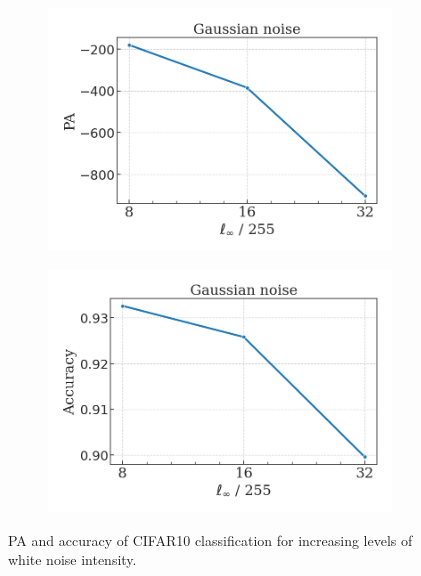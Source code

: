 \begin{figure}[H]
    \centering
    \begin{subfigure}[b]{0.45\textwidth}
        \centering
        \includegraphics[width=\textwidth]{img/results_discussion/adversarial/GAUSSIAN_logPA_eps_single.png}
    \end{subfigure}
    \hfill
    \begin{subfigure}[b]{0.45\textwidth}
        \centering
        \includegraphics[width=\textwidth]{img/results_discussion/adversarial/GAUSSIAN_acc_pa_eps_single.png}
    \end{subfigure}
    \caption{PA and accuracy of CIFAR10 classification for increasing levels of white noise intensity.}
    \label{fig:gaussian_noise}
\end{figure}

